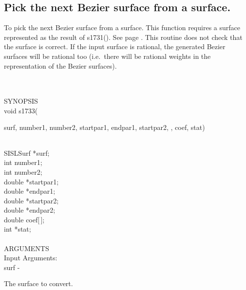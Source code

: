 \subsection{Pick the next Bezier surface from a surface.}
\begin{minipg1}
  To pick the next Bezier surface from a surface. This function
  requires a surface represented as the result of s1731(). See page
  \pageref{s1731}.
  This routine does not check that the surface is correct.
  If the input surface is rational, the generated Bezier surfaces will be
  rational too (i.e.\ there will be rational weights in the
  representation of the Bezier surfaces).
\end{minipg1} \\ \\
SYNOPSIS\\
        \>void s1733(\begin{minipg3}
                {\fov surf}, {\fov number1}, {\fov number2}, {\fov startpar1}, {\fov endpar1}, {\fov startpar2},
                 , {\fov coef}, {\fov stat})
                \end{minipg3}\\[0.3ex]
                \>\>    SISLSurf        \>      *{\fov surf};\\
                \>\>    int     \>      {\fov number1};\\
                \>\>    int     \>      {\fov number2};\\
                \>\>    double  \>      *{\fov startpar1};\\
                \>\>    double  \>      *{\fov endpar1};\\
                \>\>    double  \>      *{\fov startpar2};\\
                \>\>    double  \>      *{\fov endpar2};\\
                \>\>    double  \>      {\fov coef}[\,];\\
                \>\>    int     \>      *{\fov stat};\\
\\
ARGUMENTS\\
        \>Input Arguments:\\
        \>\>    {\fov surf}\> - \>      \begin{minipg2}
                                The surface to convert.
                                \end{minipg2}\\
